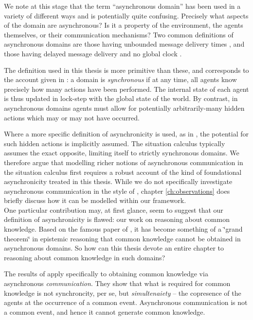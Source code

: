We note at this stage that the term {}``asynchronous domain'' has
been used in a variety of different ways and is potentially quite
confusing. Precisely what aspects of the domain are asynchronous?
Is it a property of the environment, the agents themselves, or their
communication mechanisms? Two common definitions of asynchronous domains
are those having unbounded message delivery times \citep{fischer85distributed_consensus},
and those having delayed message delivery and no global clock \citep{halpern90knowledge_distrib}.

The definition used in this thesis is more primitive than these, and
corresponds to the account given in \citep{vanBentham06tree_of_knowledge}:
a domain is \emph{synchronous} if at any time, all agents know precisely
how many actions have been performed. The internal state of each agent
is thus updated in lock-step with the global state of the world. By
contrast, in asynchronous domains agents must allow for potentially
arbitrarily-many hidden actions which may or may not have occurred.

Where a more specific definition of asynchronicity is used, as in
\citep{fischer85distributed_consensus,halpern90knowledge_distrib},
the potential for such hidden actions is implicitly assumed. The situation
calculus typically assumes the exact opposite, limiting itself to
strictly synchronous domains. We therefore argue that modelling richer
notions of asynchronous communication in the situation calculus first
requires a robust account of the kind of foundational asynchronicity
treated in this thesis. While we do not specifically investigate asynchronous
communication in the style of \citep{fischer85distributed_consensus,halpern90knowledge_distrib},
chapter \ref{ch:observations} does briefly discuss how it can be
modelled within our framework. \\


One particular contribution may, at first glance, seem to suggest
that our definition of asynchronicity is flawed: our work on reasoning
about common knowledge. Based on the famous paper of \citet{halpern90knowledge_distrib},
it has become something of a \char`\"{}grand theorem\char`\"{} in
epistemic reasoning that common knowledge cannot be obtained in asynchronous
domains. So how can this thesis devote an entire chapter to reasoning
about common knowledge in such domains?

The results of \citep{halpern90knowledge_distrib} apply specifically
to obtaining common knowledge via asynchronous \emph{communication}.
They show that what is required for common knowledge is not synchroncity,
per se, but \emph{simultenaiety} -- the copresence of the agents at
the occurrence of a common event. Asynchronous communication is not
a common event, and hence it cannot generate common knowledge.

